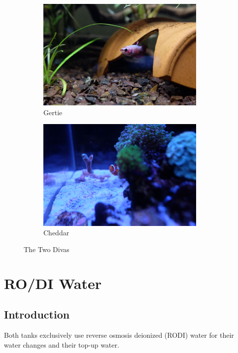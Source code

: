 \documentclass{report}
\begin{document}
\begin{figure}[h]
    \centering
    \begin{subfigure}{0.5\textwidth}
        \centering
        \includegraphics[width=0.9\textwidth]{betta1.jpg}
        \caption{Gertie}
    \end{subfigure}%
    \begin{subfigure}{0.5\textwidth}
        \centering
        \includegraphics[width=0.9\textwidth]{cheddarpeek1.jpg}
        \caption{Cheddar}
    \end{subfigure}
    \caption{The Two Divas}
\end{figure}

\newpage
\chapter{RO/DI Water}
\label{sec:rodi}
\section{Introduction}
Both tanks exclusively use reverse osmosis deionized (RODI) water for their water changes and their top-up water. 
\end{document}
